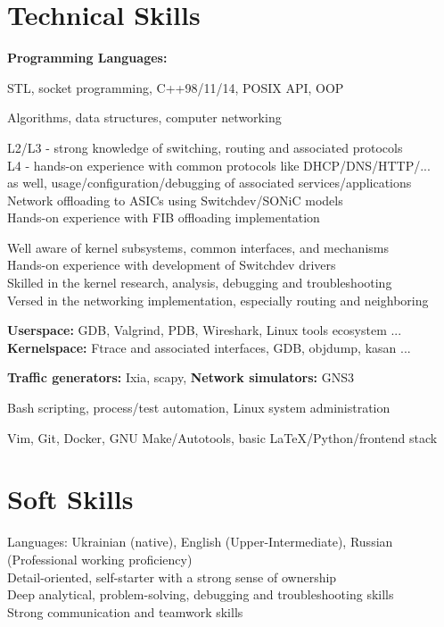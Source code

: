 \documentclass{article}
\begin{document}
\section{Technical Skills}
\textbf{Programming Languages:}
\begin{description}[align=left,leftmargin=3.8cm,style=multiline,font=\mdseries]
\item[C/C++] STL, socket programming, C++98/11/14, POSIX API, OOP
\item[Computer Science] Algorithms, data structures, computer networking
\item[Networking] L2/L3 - strong knowledge of switching, routing and associated protocols \\
                  L4 - hands-on experience with common protocols like DHCP/DNS/HTTP/... \\
                  as well, usage/configuration/debugging of associated services/applications\\
                  Network offloading to ASICs using Switchdev/SONiC models\\
                  Hands-on experience with FIB offloading implementation 
\item[Linux Kernel] Well aware of kernel subsystems, common interfaces, and mechanisms \\
                    Hands-on experience with development of Switchdev drivers \\
                    Skilled in the kernel research, analysis, debugging and troubleshooting  \\
                    Versed in the networking implementation, especially routing and neighboring
\item[Debugging]
        {\bfseries Userspace:} GDB, Valgrind, PDB, Wireshark, Linux tools ecosystem ...\\
        {\bfseries Kernelspace:} Ftrace and associated interfaces, GDB, objdump, kasan ...
\item[Virtualization]
        {\bfseries Traffic generators:} Ixia, scapy, {\bfseries Network simulators:} GNS3
\item[Scripting]            Bash scripting, process/test automation, Linux system administration
\item[General]              Vim, Git, Docker, GNU Make/Autotools, basic \LaTeX/Python/frontend stack
\end{description}

\section{Soft Skills}
Languages: Ukrainian (native), English (Upper-Intermediate), Russian (Professional working proficiency)\\
Detail-oriented, self-starter with a strong sense of ownership \\
Deep analytical, problem-solving, debugging and troubleshooting skills \\
Strong communication and teamwork skills
\end{document}
